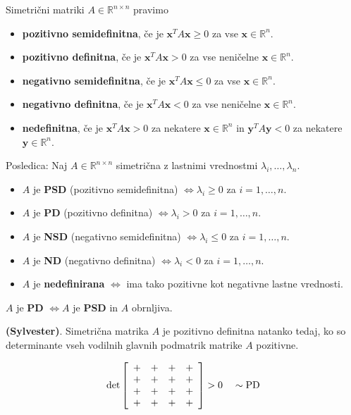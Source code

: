 \documentclass{article}
\begin{document}
\begin{multicols}{2}
	Simetrični matriki \( A \in \mathbb{R}^{n \times n} \) pravimo
	\begin{itemize}
		\item \textbf{pozitivno semidefinitna}, če je \( \mathbf{x}^T A \mathbf{x} \geq 0 \) za vse \( \mathbf{x} \in \mathbb{R}^n \).
		\item \textbf{pozitivno definitna}, če je \( \mathbf{x}^T A \mathbf{x} > 0 \) za vse neničelne \( \mathbf{x} \in \mathbb{R}^n \).
		\item \textbf{negativno semidefinitna}, če je \( \mathbf{x}^T A \mathbf{x} \leq 0 \) za vse \( \mathbf{x} \in \mathbb{R}^n \).
		\item \textbf{negativno definitna}, če je \( \mathbf{x}^T A \mathbf{x} < 0 \) za vse neničelne \( \mathbf{x} \in \mathbb{R}^n \).
		\item \textbf{nedefinitna}, če je \( \mathbf{x}^T A \mathbf{x} > 0 \) za nekatere \( \mathbf{x} \in \mathbb{R}^n \) in \( \mathbf{y}^T A \mathbf{y} < 0 \) za nekatere \( \mathbf{y} \in \mathbb{R}^n \).
	\end{itemize}

	Posledica: Naj \( A \in \mathbb{R}^{n \times n} \) simetrična z lastnimi vrednostmi \( \lambda_i, \ldots, \lambda_n \).
	\begin{itemize}
		\item \( A \) je \textbf{PSD} (pozitivno semidefinitna) \( \Leftrightarrow \lambda_i \geq 0 \) za \( i=1,\ldots,n \).
		\item \( A \) je \textbf{PD} (pozitivno definitna) \( \Leftrightarrow \lambda_i > 0 \) za \( i=1,\ldots,n \).
		\item \( A \) je \textbf{NSD} (negativno semidefinitna) \( \Leftrightarrow \lambda_i \leq 0 \) za \( i=1,\ldots,n \).
		\item \( A \) je \textbf{ND} (negativno definitna) \( \Leftrightarrow \lambda_i < 0 \) za \( i=1,\ldots,n \).
		\item \( A \) je \textbf{nedefinirana} \( \Leftrightarrow \) ima tako pozitivne kot negativne lastne vrednosti.
	\end{itemize}
	\( A \) je \textbf{PD} \( \Leftrightarrow A \) je \textbf{PSD} in \( A \) obrnljiva.

	\textbf{(Sylvester)}. Simetrična matrika \( A \) je pozitivno definitna natanko tedaj, ko so determinante vseh vodilnih glavnih podmatrik matrike \( A \) pozitivne.

	\[
		\text{det} \left[
			\begin{array}{cccc}
				+ & + & + & + \\
				+ & + & + & + \\
				+ & + & + & + \\
				+ & + & + & + \\
			\end{array}
			\right] > 0 \quad \sim \text{PD} \\
	\]


\end{multicols}
\end{document}
